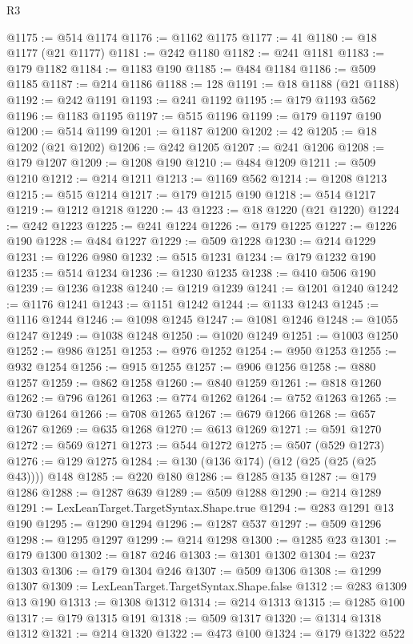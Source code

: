 \begin{lexlean}{R3}
\begin{coremodule}
@1175 := @514 @1174
@1176 := @1162 @1175
@1177 := 41
@1180 := @18 @1177 (@21 @1177)
@1181 := @242 @1180
@1182 := @241 @1181
@1183 := @179 @1182
@1184 := @1183 @190
@1185 := @484 @1184
@1186 := @509 @1185
@1187 := @214 @1186
@1188 := 128
@1191 := @18 @1188 (@21 @1188)
@1192 := @242 @1191
@1193 := @241 @1192
@1195 := @179 @1193 @562
@1196 := @1183 @1195
@1197 := @515 @1196
@1199 := @179 @1197 @190
@1200 := @514 @1199
@1201 := @1187 @1200
@1202 := 42
@1205 := @18 @1202 (@21 @1202)
@1206 := @242 @1205
@1207 := @241 @1206
@1208 := @179 @1207
@1209 := @1208 @190
@1210 := @484 @1209
@1211 := @509 @1210
@1212 := @214 @1211
@1213 := @1169 @562
@1214 := @1208 @1213
@1215 := @515 @1214
@1217 := @179 @1215 @190
@1218 := @514 @1217
@1219 := @1212 @1218
@1220 := 43
@1223 := @18 @1220 (@21 @1220)
@1224 := @242 @1223
@1225 := @241 @1224
@1226 := @179 @1225
@1227 := @1226 @190
@1228 := @484 @1227
@1229 := @509 @1228
@1230 := @214 @1229
@1231 := @1226 @980
@1232 := @515 @1231
@1234 := @179 @1232 @190
@1235 := @514 @1234
@1236 := @1230 @1235
@1238 := @410 @506 @190
@1239 := @1236 @1238
@1240 := @1219 @1239
@1241 := @1201 @1240
@1242 := @1176 @1241
@1243 := @1151 @1242
@1244 := @1133 @1243
@1245 := @1116 @1244
@1246 := @1098 @1245
@1247 := @1081 @1246
@1248 := @1055 @1247
@1249 := @1038 @1248
@1250 := @1020 @1249
@1251 := @1003 @1250
@1252 := @986 @1251
@1253 := @976 @1252
@1254 := @950 @1253
@1255 := @932 @1254
@1256 := @915 @1255
@1257 := @906 @1256
@1258 := @880 @1257
@1259 := @862 @1258
@1260 := @840 @1259
@1261 := @818 @1260
@1262 := @796 @1261
@1263 := @774 @1262
@1264 := @752 @1263
@1265 := @730 @1264
@1266 := @708 @1265
@1267 := @679 @1266
@1268 := @657 @1267
@1269 := @635 @1268
@1270 := @613 @1269
@1271 := @591 @1270
@1272 := @569 @1271
@1273 := @544 @1272
@1275 := @507 (@529 @1273)
@1276 := @129 @1275
@1284 := @130 (@136 @174) (@12 (@25 (@25 (@25 @43)))) @148
@1285 := @220 @180
@1286 := @1285 @135
@1287 := @179 @1286
@1288 := @1287 @639
@1289 := @509 @1288
@1290 := @214 @1289
@1291 := LexLeanTarget.TargetSyntax.Shape.true
@1294 := @283 @1291 @13 @190
@1295 := @1290 @1294
@1296 := @1287 @537
@1297 := @509 @1296
@1298 := @1295 @1297
@1299 := @214 @1298
@1300 := @1285 @23
@1301 := @179 @1300
@1302 := @187 @246
@1303 := @1301 @1302
@1304 := @237 @1303
@1306 := @179 @1304 @246
@1307 := @509 @1306
@1308 := @1299 @1307
@1309 := LexLeanTarget.TargetSyntax.Shape.false
@1312 := @283 @1309 @13 @190
@1313 := @1308 @1312
@1314 := @214 @1313
@1315 := @1285 @100
@1317 := @179 @1315 @191
@1318 := @509 @1317
@1320 := @1314 @1318 @1312
@1321 := @214 @1320
@1322 := @473 @100
@1324 := @179 @1322 @522

\end{coremodule}
\end{lexlean}
